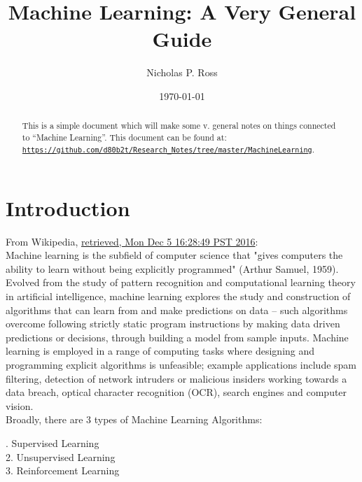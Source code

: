 \documentclass[11pt]{article}
\begin{document}
\title{Machine Learning: A Very General Guide}
\author{Nicholas P. Ross}
\date{\today}
\maketitle


\begin{abstract}
This is a simple document which will make some v. general notes on 
things connected to ``Machine Learning''. This document can be found at:\\
\href{https://github.com/d80b2t/Research_Notes/tree/master/MachineLearning}{\tt https://github.com/d80b2t/Research\_Notes/tree/master/MachineLearning}. 
\end{abstract}




\section{Introduction}
From Wikipedia,  
\href{https://en.wikipedia.org/w/index.php?title=Machine_learning&oldid=753193210}{retrieved, Mon Dec  5 16:28:49 PST 2016}: \\

Machine learning is the subfield of computer science that "gives
computers the ability to learn without being explicitly programmed"
(Arthur Samuel, 1959). Evolved from the study of pattern recognition
and computational learning theory in artificial intelligence, machine
learning explores the study and construction of algorithms that can
learn from and make predictions on data – such algorithms overcome
following strictly static program instructions by making data driven
predictions or decisions, through building a model from sample
inputs. Machine learning is employed in a range of computing tasks
where designing and programming explicit algorithms is unfeasible;
example applications include spam filtering, detection of network
intruders or malicious insiders working towards a data breach, optical
character recognition (OCR), search engines and computer vision.\\


\smallskip \smallskip
\noindent
Broadly, there are 3 types of Machine Learning Algorithms:

. Supervised Learning\\
2. Unsupervised Learning\\
3. Reinforcement Learning\\
\end{document}
